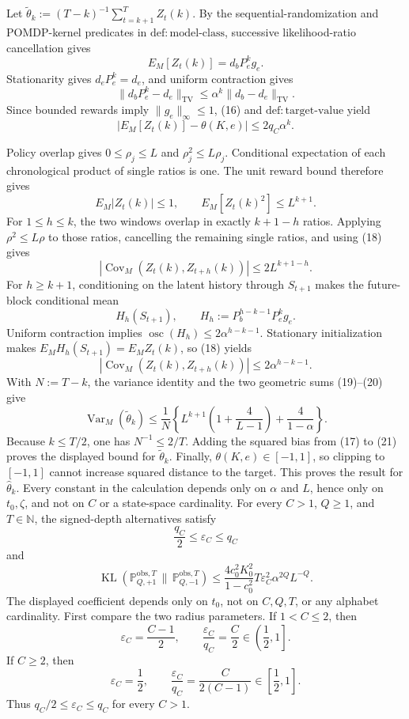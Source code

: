 Let \(\widetilde\theta_k:=(T-k)^{-1}\sum_{t=k+1}^TZ_t(k)\).  By the sequential-randomization and POMDP-kernel predicates in \(\mathrm{def{:}model\text{-}class}\), successive likelihood-ratio cancellation gives
\[
 E_M[Z_t(k)]=d_bP_e^kg_e.
\]
Stationarity gives \(d_eP_e^k=d_e\), and uniform contraction gives
\[
 \lVert d_bP_e^k-d_e\rVert_{\mathrm{TV}}
 \le\alpha^k\lVert d_b-d_e\rVert_{\mathrm{TV}}.
\]
Since bounded rewards imply \(\lVert g_e\rVert_\infty\le1\), (16) and \(\mathrm{def{:}target\text{-}value}\) yield
\[
 |E_M[Z_t(k)]-\theta(K,e)|\le2q_C\alpha^k. \tag{17}
\]

Policy overlap gives \(0\le\rho_j\le L\) and \(\rho_j^2\le L\rho_j\).  Conditional expectation of each chronological product of single ratios is one.  The unit reward bound therefore gives
\[
 E_M|Z_t(k)|\le1,
 \qquad E_M[Z_t(k)^2]\le L^{k+1}. \tag{18}
\]
For \(1\le h\le k\), the two windows overlap in exactly \(k+1-h\) ratios.  Applying \(\rho^2\le L\rho\) to those ratios, cancelling the remaining single ratios, and using (18) gives
\[
 |\operatorname{Cov}_M(Z_t(k),Z_{t+h}(k))|
 \le2L^{k+1-h}. \tag{19}
\]
For \(h\ge k+1\), conditioning on the latent history through \(S_{t+1}\) makes the future-block conditional mean
\[
 H_h(S_{t+1}),
 \qquad H_h:=P_b^{h-k-1}P_e^kg_e.
\]
Uniform contraction implies \(\operatorname{osc}(H_h)\le2\alpha^{h-k-1}\).  Stationary initialization makes \(E_MH_h(S_{t+1})=E_MZ_t(k)\), so (18) yields
\[
 |\operatorname{Cov}_M(Z_t(k),Z_{t+h}(k))|
 \le2\alpha^{h-k-1}. \tag{20}
\]
With \(N:=T-k\), the variance identity and the two geometric sums (19)--(20) give
\[
 \operatorname{Var}_M(\widetilde\theta_k)
 \le\frac1N\left\{L^{k+1}\left(1+\frac4{L-1}\right)
 +\frac4{1-\alpha}\right\}. \tag{21}
\]
Because \(k\le T/2\), one has \(N^{-1}\le2/T\).  Adding the squared bias from (17) to (21) proves the displayed bound for \(\widetilde\theta_k\).  Finally, \(\theta(K,e)\in[-1,1]\), so clipping to \([-1,1]\) cannot increase squared distance to the target.  This proves the result for \(\widehat\theta_k\).  Every constant in the calculation depends only on \(\alpha\) and \(L\), hence only on \(t_0,\zeta\), and not on \(C\) or a state-space cardinality.
For every \(C>1\), \(Q\ge1\), and \(T\in\mathbb N\), the signed-depth alternatives satisfy
\[
 \frac{q_C}{2}\le\varepsilon_C\le q_C
\]
and
\[
 \operatorname{KL}(\mathbb P_{Q,+1}^{\mathrm{obs},T}\,\|\,
                    \mathbb P_{Q,-1}^{\mathrm{obs},T})
 \le
 \frac{4c_0^2K_0^2}{1-c_0^2}
 T\varepsilon_C^2\alpha^{2Q}L^{-Q}.
\]
The displayed coefficient depends only on \(t_0\), not on \(C,Q,T\), or any alphabet cardinality.
First compare the two radius parameters.  If \(1<C\le2\), then
\[
 \varepsilon_C=\frac{C-1}{2},
 \qquad
 \frac{\varepsilon_C}{q_C}=\frac C2\in\left(\frac12,1\right].
\]
If \(C\ge2\), then
\[
 \varepsilon_C=\frac12,
 \qquad
 \frac{\varepsilon_C}{q_C}=\frac{C}{2(C-1)}\in\left[\frac12,1\right].
\]
Thus \(q_C/2\le\varepsilon_C\le q_C\) for every \(C>1\).

